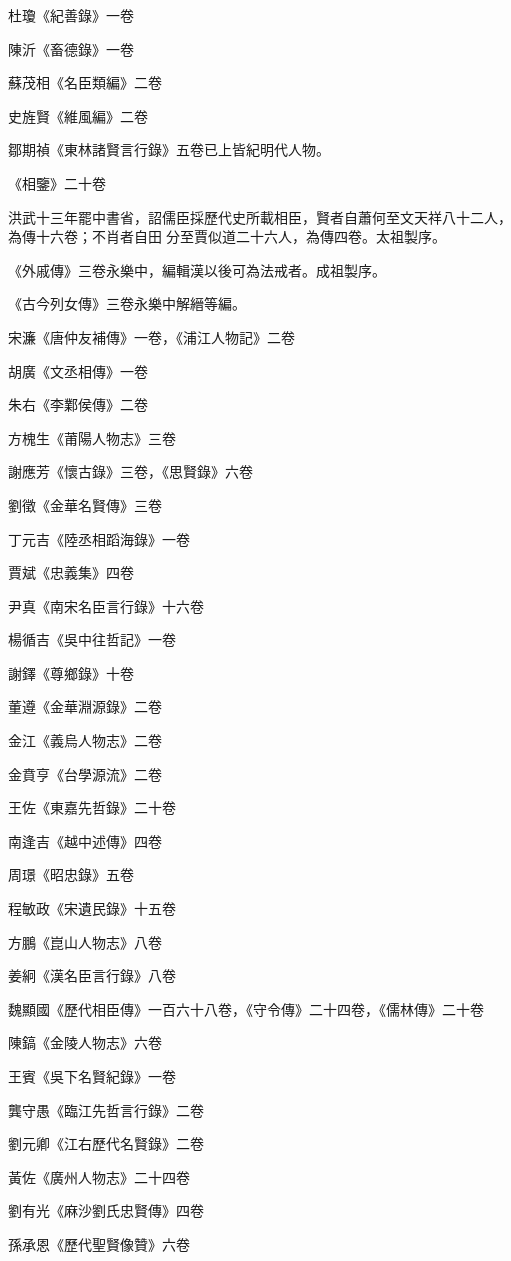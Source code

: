 杜瓊《紀善錄》一卷

陳沂《畜德錄》一卷

蘇茂相《名臣類編》二卷

史旌賢《維風編》二卷

鄒期禎《東林諸賢言行錄》五卷已上皆紀明代人物。

《相鑒》二十卷

洪武十三年罷中書省，詔儒臣採歷代史所載相臣，賢者自蕭何至文天祥八十二人，為傳十六卷；不肖者自田分至賈似道二十六人，為傳四卷。太祖製序。

《外戚傳》三卷永樂中，編輯漢以後可為法戒者。成祖製序。

《古今列女傳》三卷永樂中解縉等編。

宋濂《唐仲友補傳》一卷，《浦江人物記》二卷

胡廣《文丞相傳》一卷

朱右《李鄴侯傳》二卷

方槐生《莆陽人物志》三卷

謝應芳《懷古錄》三卷，《思賢錄》六卷

劉徵《金華名賢傳》三卷

丁元吉《陸丞相蹈海錄》一卷

賈斌《忠義集》四卷

尹真《南宋名臣言行錄》十六卷

楊循吉《吳中往哲記》一卷

謝鐸《尊鄉錄》十卷

董遵《金華淵源錄》二卷

金江《義烏人物志》二卷

金賁亨《台學源流》二卷

王佐《東嘉先哲錄》二十卷

南逢吉《越中述傳》四卷

周璟《昭忠錄》五卷

程敏政《宋遺民錄》十五卷

方鵬《崑山人物志》八卷

姜絅《漢名臣言行錄》八卷

魏顯國《歷代相臣傳》一百六十八卷，《守令傳》二十四卷，《儒林傳》二十卷

陳鎬《金陵人物志》六卷

王賓《吳下名賢紀錄》一卷

龔守愚《臨江先哲言行錄》二卷

劉元卿《江右歷代名賢錄》二卷

黃佐《廣州人物志》二十四卷

劉有光《麻沙劉氏忠賢傳》四卷

孫承恩《歷代聖賢像贊》六卷

